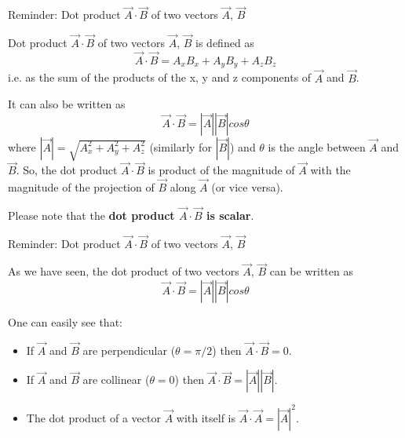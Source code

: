 {%
%
%

\begin{frame}{Reminder: Dot product $\vec{A} \cdot \vec{B}$ of two vectors $\vec{A}$, $\vec{B}$}

Dot product $\vec{A} \cdot \vec{B}$ of two vectors $\vec{A}$, $\vec{B}$ is defined as
\begin{equation*}
  \vec{A} \cdot \vec{B} = A_{x} B_{x} + A_{y} B_{y} + A_{z} B_{z}
\end{equation*}
i.e. as the sum of the products of the x, y and z components of $\vec{A}$ and $\vec{B}$.\\
\vspace{0.3cm}

It can also be written as
\begin{equation*}
  \vec{A} \cdot \vec{B} =  |\vec{A}| |\vec{B}| cos\theta
\end{equation*}
where $|\vec{A}| = \sqrt{A_x^2+A_y^2+A_z^2}$ (similarly for $|\vec{B}|$) and $\theta$ is the
angle between $\vec{A}$ and $\vec{B}$.
So, the dot product $\vec{A} \cdot \vec{B}$ is
product of the magnitude of $\vec{A}$ with the magnitude of the
projection of $\vec{B}$ along $\vec{A}$ (or vice versa).\\
\vspace{0.3cm}

Please note that the {\bf dot product $\vec{A} \cdot \vec{B}$ is scalar}.

\end{frame}

%
%
%

\begin{frame}{Reminder: Dot product $\vec{A} \cdot \vec{B}$ of two vectors $\vec{A}$, $\vec{B}$}

As we have seen, the dot product of two vectors $\vec{A}$, $\vec{B}$ can be written as
\begin{equation*}
  \vec{A} \cdot \vec{B} =  |\vec{A}| |\vec{B}| cos\theta
\end{equation*}

One can easily see that:
\begin{itemize}
 \item If $\vec{A}$ and $\vec{B}$ are perpendicular ($\theta=\pi/2$) then $\vec{A} \cdot \vec{B} = 0$.
 \item If $\vec{A}$ and $\vec{B}$ are collinear ($\theta=0$) then $\vec{A} \cdot \vec{B} =  |\vec{A}| |\vec{B}|$.
 \item The dot product of a vector $\vec{A}$ with itself is $\vec{A} \cdot \vec{A} =  |\vec{A}|^2$.
\end{itemize}


\end{frame}}

